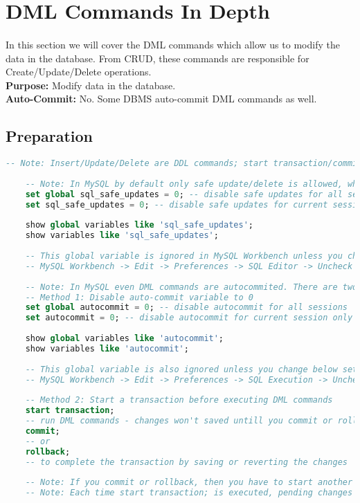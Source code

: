 
\section{\acs{DML} Commands In Depth}
\paragraph{} In this section we will cover the \acf{DML} commands which allow us to modify the data in the database. From \acs{CRUD}, these commands are responsible for Create/Update/Delete operations.\\\textbf{Purpose:} Modify data in the database.\\\textbf{Auto-Commit:} No. Some \acs{DBMS} auto-commit \acs{DML} commands as well.
\subsection{Preparation}
\begin{lstlisting}[language=SQL]
	-- Note: Insert/Update/Delete are DDL commands; start transaction/commit/rollback are TCL commands
	
	-- Note: In MySQL by default only safe update/delete is allowed, which means only by using a primary key in where clause. To change this please run below two commands:
	set global sql_safe_updates = 0; -- disable safe updates for all sessions
	set sql_safe_updates = 0; -- disable safe updates for current session only
	
	show global variables like 'sql_safe_updates';
	show variables like 'sql_safe_updates';
	
	-- This global variable is ignored in MySQL Workbench unless you change below setting:
	-- MySQL Workbench -> Edit -> Preferences -> SQL Editor -> Uncheck Safe Updates box at the end
	
	-- Note: In MySQL even DML commands are autocommited. There are two methods to work around this:
	-- Method 1: Disable auto-commit variable to 0
	set global autocommit = 0; -- disable autocommit for all sessions
	set autocommit = 0; -- disable autocommit for current session only
	
	show global variables like 'autocommit';
	show variables like 'autocommit';
	
	-- This global variable is also ignored unless you change below setting:
	-- MySQL Workbench -> Edit -> Preferences -> SQL Execution -> Uncheck New connections use auto commit mode
	
	-- Method 2: Start a transaction before executing DML commands
	start transaction;
	-- run DML commands - changes won't saved untill you commit or rollback
	commit;
	-- or
	rollback;
	-- to complete the transaction by saving or reverting the changes
	
	-- Note: If you commit or rollback, then you have to start another transaction, else DML commands will auto-commit again
	-- Note: Each time start transaction; is executed, pending changes in current session will be committed
\end{lstlisting}
